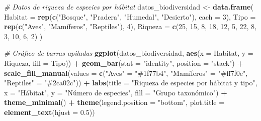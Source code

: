 \documentclass[
]{article}
\newenvironment{Shaded}{\begin{snugshade}}{\end{snugshade}}
\newcommand{\AttributeTok}[1]{\textcolor[rgb]{0.13,0.29,0.53}{#1}}
\newcommand{\CommentTok}[1]{\textcolor[rgb]{0.56,0.35,0.01}{\textit{#1}}}
\newcommand{\DecValTok}[1]{\textcolor[rgb]{0.00,0.00,0.81}{#1}}
\newcommand{\FloatTok}[1]{\textcolor[rgb]{0.00,0.00,0.81}{#1}}
\newcommand{\FunctionTok}[1]{\textcolor[rgb]{0.13,0.29,0.53}{\textbf{#1}}}
\newcommand{\NormalTok}[1]{#1}
\newcommand{\OtherTok}[1]{\textcolor[rgb]{0.56,0.35,0.01}{#1}}
\newcommand{\SpecialCharTok}[1]{\textcolor[rgb]{0.81,0.36,0.00}{\textbf{#1}}}
\newcommand{\StringTok}[1]{\textcolor[rgb]{0.31,0.60,0.02}{#1}}
\begin{document}
\begin{Shaded}
\begin{Highlighting}[]
\CommentTok{\# Datos de riqueza de especies por hábitat}
\NormalTok{datos\_biodiversidad }\OtherTok{\textless{}{-}} \FunctionTok{data.frame}\NormalTok{(}
  \AttributeTok{Habitat =} \FunctionTok{rep}\NormalTok{(}\FunctionTok{c}\NormalTok{(}\StringTok{"Bosque"}\NormalTok{, }\StringTok{"Pradera"}\NormalTok{, }\StringTok{"Humedal"}\NormalTok{, }\StringTok{"Desierto"}\NormalTok{), }\AttributeTok{each =} \DecValTok{3}\NormalTok{),}
  \AttributeTok{Tipo =} \FunctionTok{rep}\NormalTok{(}\FunctionTok{c}\NormalTok{(}\StringTok{"Aves"}\NormalTok{, }\StringTok{"Mamíferos"}\NormalTok{, }\StringTok{"Reptiles"}\NormalTok{), }\DecValTok{4}\NormalTok{),}
  \AttributeTok{Riqueza =} \FunctionTok{c}\NormalTok{(}\DecValTok{25}\NormalTok{, }\DecValTok{15}\NormalTok{, }\DecValTok{8}\NormalTok{, }\DecValTok{18}\NormalTok{, }\DecValTok{12}\NormalTok{, }\DecValTok{5}\NormalTok{, }\DecValTok{22}\NormalTok{, }\DecValTok{8}\NormalTok{, }\DecValTok{3}\NormalTok{, }\DecValTok{10}\NormalTok{, }\DecValTok{6}\NormalTok{, }\DecValTok{2}\NormalTok{)}
\NormalTok{)}

\CommentTok{\# Gráfico de barras apiladas}
\FunctionTok{ggplot}\NormalTok{(datos\_biodiversidad, }\FunctionTok{aes}\NormalTok{(}\AttributeTok{x =}\NormalTok{ Habitat, }\AttributeTok{y =}\NormalTok{ Riqueza, }\AttributeTok{fill =}\NormalTok{ Tipo)) }\SpecialCharTok{+}
  \FunctionTok{geom\_bar}\NormalTok{(}\AttributeTok{stat =} \StringTok{"identity"}\NormalTok{, }\AttributeTok{position =} \StringTok{"stack"}\NormalTok{) }\SpecialCharTok{+}
  \FunctionTok{scale\_fill\_manual}\NormalTok{(}\AttributeTok{values =} \FunctionTok{c}\NormalTok{(}\StringTok{"Aves"} \OtherTok{=} \StringTok{"\#1f77b4"}\NormalTok{, }\StringTok{"Mamíferos"} \OtherTok{=} \StringTok{"\#ff7f0e"}\NormalTok{, }\StringTok{"Reptiles"} \OtherTok{=} \StringTok{"\#2ca02c"}\NormalTok{)) }\SpecialCharTok{+}
  \FunctionTok{labs}\NormalTok{(}\AttributeTok{title =} \StringTok{"Riqueza de especies por hábitat y tipo"}\NormalTok{,}
       \AttributeTok{x =} \StringTok{"Hábitat"}\NormalTok{,}
       \AttributeTok{y =} \StringTok{"Número de especies"}\NormalTok{,}
       \AttributeTok{fill =} \StringTok{"Grupo taxonómico"}\NormalTok{) }\SpecialCharTok{+}
  \FunctionTok{theme\_minimal}\NormalTok{() }\SpecialCharTok{+}
  \FunctionTok{theme}\NormalTok{(}\AttributeTok{legend.position =} \StringTok{"bottom"}\NormalTok{,}
        \AttributeTok{plot.title =} \FunctionTok{element\_text}\NormalTok{(}\AttributeTok{hjust =} \FloatTok{0.5}\NormalTok{))}
\end{Highlighting}
\end{Shaded}
\end{document}
